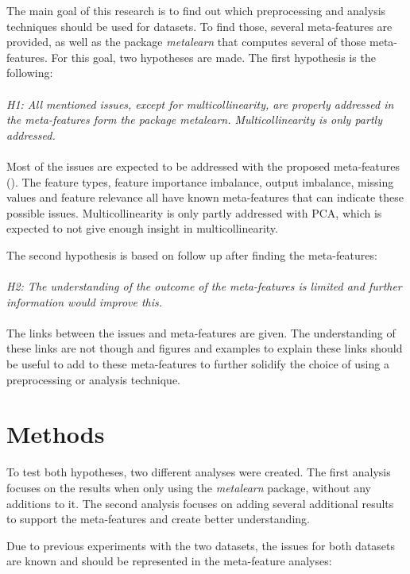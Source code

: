 \documentclass[10pt,a4paper]{article}
\begin{document}
	The main goal of this research is to find out which preprocessing and analysis techniques should be used for datasets. To find those, several meta-features are provided, as well as the package \textit{metalearn} that computes several of those meta-features. For this goal, two hypotheses are made. 
	The first hypothesis is the following: \\
	\\
	
	\textit{H1: All mentioned issues, except for multicollinearity, are properly addressed in the meta-features form the package \textit{metalearn}. Multicollinearity is only partly addressed.} \\
	\\
	Most of the issues are expected to be addressed with the proposed meta-features (). The feature types, feature importance imbalance, output imbalance, missing values and feature relevance all have known meta-features that can indicate these possible issues. Multicollinearity is only partly addressed with PCA, which is expected to not give enough insight in multicollinearity.
	
	The second hypothesis is based on follow up after finding the meta-features: \\
	\\
	\textit{H2: The understanding of the outcome of the meta-features is limited and further information would improve this.} \\
	\\
	The links between the issues and meta-features are given. The understanding of these links are not though and figures and examples to explain these links should be useful to add to these meta-features to further solidify the choice of using a preprocessing or analysis technique.
	
	\section{Methods}
	\label{sec:Methods}
	
	To test both hypotheses, two different analyses were created. The first analysis focuses on the results when only using the \textit{metalearn} package, without any additions to it. The second analysis focuses on adding several additional results to support the meta-features and create better understanding.
	
	Due to previous experiments with the two datasets, the issues for both datasets are known and should be represented in the meta-feature analyses:
	
\end{document}
